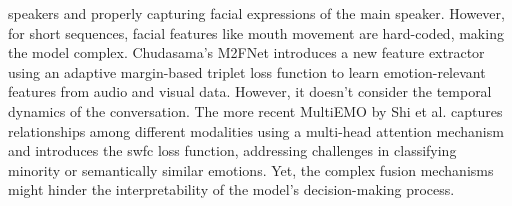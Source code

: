 speakers and properly capturing facial expressions of the main speaker. However, for short sequences, facial features like mouth movement are hard-coded, making the model complex. Chudasama's M2FNet \cite{m2fnet} introduces a new feature extractor using an adaptive margin-based triplet loss function to learn emotion-relevant features from audio and visual data. However, it doesn't consider the temporal dynamics of the conversation. The more recent MultiEMO \cite{multiemo} by Shi et al. captures relationships among different modalities using a multi-head attention mechanism and introduces the \ac{swfc} loss function, addressing challenges in classifying minority or semantically similar emotions. Yet, the complex fusion mechanisms might hinder the interpretability of the model's decision-making process.
